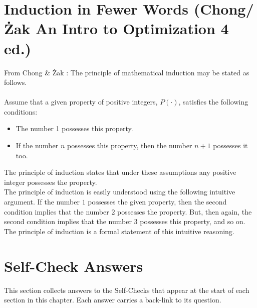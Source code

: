 \newpage
\section{Induction in Fewer Words (Chong/\.Zak An Intro to Optimization 4 ed.)}
\label{sec:ChongInduction}
From Chong \& \.Zak \cite{chong2013introduction}: The principle of mathematical induction may be stated as follows. \\ \\
Assume that a given property of positive integers, $P(\cdot)$, satisfies the following conditions:
\begin{itemize}
    \item The number 1 possesses this property.
    \item If the number $n$ possesses this property, then the number $n + 1$ possesses it too.
\end{itemize}
The principle of induction states that under these assumptions any positive integer possesses the
property.\\

The principle of induction is easily understood using the following intuitive argument. If the number
$1$ possesses the given property, then the second condition implies that the number $2$ possesses the
property. But, then again, the second condition implies that the number $3$ possesses this property, and so on. The principle of induction is a formal statement of this intuitive reasoning.

\newpage
\section{Self-Check Answers}
\label{sec:ch0SelfCheckAnswers}

\noindent This section collects answers to the Self-Checks that appear at the start of each section in this chapter. Each answer carries a back-link to its question.

